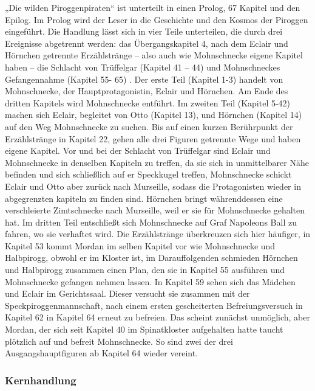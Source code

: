 „Die wilden Piroggenpiraten“ ist unterteilt in einen Prolog, 67 Kapitel und den Epilog. Im Prolog wird der Leser in die Geschichte und den Kosmos der Piroggen eingeführt. Die Handlung lässt sich in vier Teile unterteilen, die durch drei Ereignisse abgetrennt werden: das Übergangskapitel 4, nach dem Eclair und Hörnchen getrennte Erzählstränge – also auch wie Mohnschnecke eigene Kapitel haben – die Schlacht von Trüffelgar (Kapitel 41 – 44) und Mohnschneckes Gefangennahme (Kapitel 55- 65) . Der erste Teil (Kapitel 1-3) handelt von Mohnschnecke, der Hauptprotagonistin, Eclair und Hörnchen. Am Ende des dritten Kapitels wird Mohnschnecke entführt. Im zweiten Teil (Kapitel 5-42) machen sich Eclair, begleitet von Otto (Kapitel 13), und Hörnchen (Kapitel 14) auf den Weg Mohnschnecke zu suchen. Bis auf einen kurzen Berührpunkt der Erzählstränge in Kapitel 22, gehen alle drei Figuren getrennte Wege und haben eigene Kapitel. Vor und bei der Schlacht von Trüffelgar sind Eclair und Mohnschnecke in denselben Kapiteln zu treffen, da sie sich in unmittelbarer Nähe befinden und sich schließlich auf er Speckkugel treffen,  Mohnschnecke schickt Eclair und Otto aber zurück nach Murseille, sodass die Protagonisten wieder in abgegrenzten kapiteln zu finden sind. Hörnchen bringt währenddessen eine verschleierte Zimtschnecke nach Murseille, weil er sie für Mohnschnecke gehalten hat. Im dritten Teil entschließt sich Mohnschnecke auf Graf Napoleons Ball zu fahren, wo sie verhaftet wird. Die Erzählstränge überkreuzen sich hier häufiger, in Kapitel 53 kommt Mordan im selben Kapitel vor wie Mohnschnecke und Halbpirogg, obwohl er im Kloster ist, im Darauffolgenden schmieden Hörnchen und Halbpirogg zusammen einen Plan, den sie in Kapitel 55 ausführen und Mohnschnecke gefangen nehmen lassen. In Kapitel 59 sehen sich das Mädchen und Eclair im Gerichtssaal. Dieser versucht sie zusammen mit der Speckpiroggenmannschaft, nach einem ersten gescheiterten Befreiungsversuch in Kapitel 62 in Kapitel 64 erneut zu befreien. Das scheint zunächst unmöglich, aber Mordan, der sich seit Kapitel 40 im Spinatkloster aufgehalten hatte taucht plötzlich auf und befreit Mohnschnecke. So sind zwei der drei Ausgangshauptfiguren ab Kapitel 64 wieder vereint.

\subsubsection{Kernhandlung}

